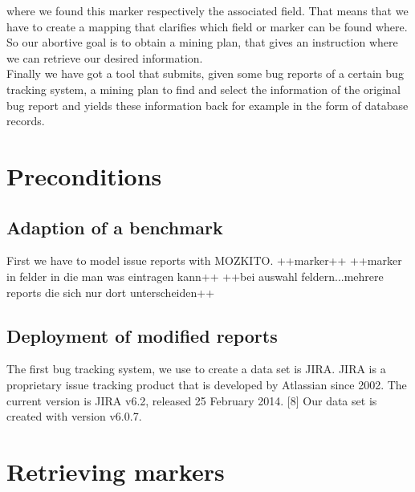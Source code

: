 where we found this marker respectively the associated field. That means that we have to create a mapping that clarifies which field or marker can be found where. So our abortive goal is to obtain a mining plan, that gives an instruction where we can retrieve our desired information. \\  Finally we have got a tool that submits, given some bug reports of a certain bug tracking system, a mining plan to find and select the information of the original bug report and yields these information back for example in the form of database records. 

\section{Preconditions}
\label{Preconditions}

\subsection{Adaption of a benchmark}
First we have to model issue reports with MOZKITO. 
++marker++
++marker in felder in die man was eintragen kann++
++bei auswahl feldern...mehrere reports die sich nur dort unterscheiden++
 


\subsection{Deployment of modified reports}
The first bug tracking system, we use to create a data set is JIRA. JIRA is a proprietary issue tracking product that is developed by Atlassian since 2002. The current version is JIRA v6.2, released 25 February 2014. [8] Our data set is created with version v6.0.7.

\section{Retrieving markers}
\label{Retrieving markers}

